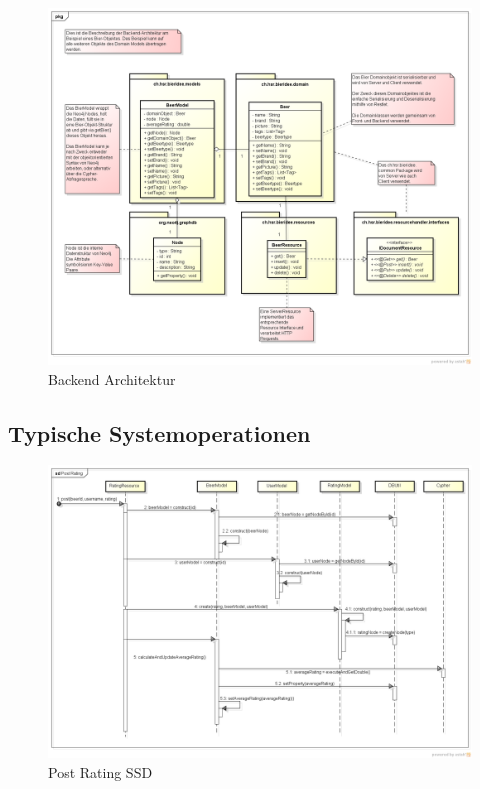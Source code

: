 \documentclass[10pt,a4paper]{scrartcl}
\begin{document}
\begin{figure}[H]
	\includegraphics[height=\textwidth,angle=90]{BackendArchitektur.png}
	\caption{Backend Architektur}
	\label{fig:backend_architecture}
\end{figure}

\subsection{Typische Systemoperationen}
\begin{figure}[H]
	\includegraphics[height=\textwidth,angle=90]{PostRatingSSD.png}
	\caption{Post Rating SSD}
	\label{fig:post_rating_ssd}
\end{figure}
\end{document}

